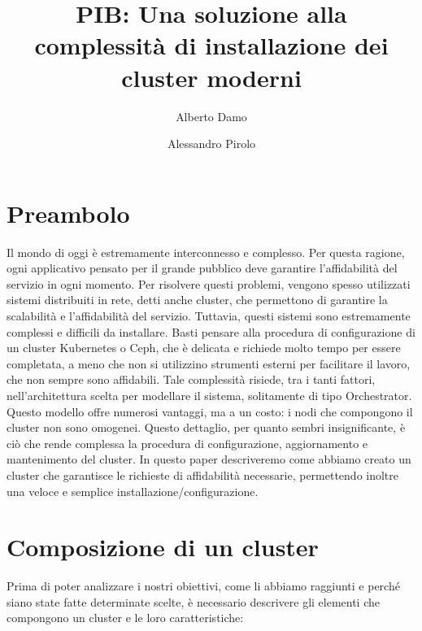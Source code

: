 \documentclass[acmtog]{acmart}
\title{PIB: Una soluzione alla complessità di installazione dei cluster moderni}
\author{Alberto Damo}
\author{Alessandro Pirolo}
\affiliation{%
  \institution{Università degli Studi di Padova}
  \city{Padova}
  \state{Veneto}
  \country{Italia}
}
\begin{document}
\maketitle


\section{Preambolo}
Il mondo di oggi è estremamente interconnesso e complesso. Per questa ragione, ogni applicativo pensato per il grande pubblico deve garantire l'affidabilità del servizio in ogni momento. Per risolvere questi problemi, vengono spesso utilizzati sistemi distribuiti in rete, detti anche cluster, che permettono di garantire la scalabilità e l'affidabilità del servizio. Tuttavia, questi sistemi sono estremamente complessi e difficili da installare. Basti pensare alla procedura di configurazione di un cluster Kubernetes o Ceph, che è delicata e richiede molto tempo per essere completata, a meno che non si utilizzino strumenti esterni per facilitare il lavoro, che non sempre sono affidabili. Tale complessità risiede, tra i tanti fattori, nell'architettura scelta per modellare il sistema, solitamente di tipo Orchestrator. Questo modello offre numerosi vantaggi, ma a un costo: i nodi che compongono il cluster non sono omogenei. Questo dettaglio, per quanto sembri insignificante, è ciò che rende complessa la procedura di configurazione, aggiornamento e mantenimento del cluster. In questo paper descriveremo come abbiamo creato un cluster che garantisce le richieste di affidabilità necessarie, permettendo inoltre una veloce e semplice installazione/configurazione.

\newpage
\section{Composizione di un cluster}
Prima di poter analizzare i nostri obiettivi, come li abbiamo raggiunti e perché siano state fatte determinate scelte, è necessario descrivere gli elementi che compongono un cluster e le loro caratteristiche:
\end{document}
